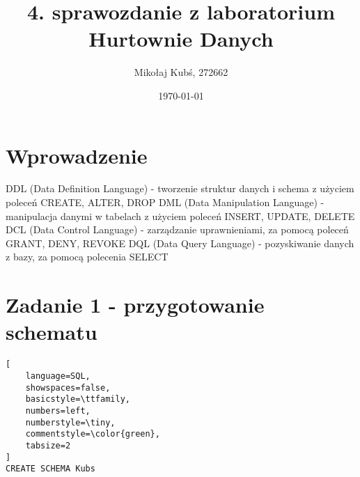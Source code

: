 \documentclass[a4paper,12pt]{article}
\title{4. sprawozdanie z laboratorium Hurtownie Danych}
\author{Mikołaj Kubś, 272662}
\date{\today}
\begin{document}
\maketitle

\section{Wprowadzenie}

DDL (Data Definition Language) - tworzenie struktur danych i schema z użyciem poleceń CREATE, ALTER, DROP
DML (Data Manipulation Language) - manipulacja danymi w tabelach z użyciem poleceń INSERT, UPDATE, DELETE
DCL (Data Control Language) - zarządzanie uprawnieniami, za pomocą poleceń GRANT, DENY, REVOKE
DQL (Data Query Language) - pozyskiwanie danych z bazy, za pomocą polecenia SELECT

\section{Zadanie 1 - przygotowanie schematu}

 {\small
  \begin{lstlisting}[
	language=SQL,
	showspaces=false,
	basicstyle=\ttfamily,
	numbers=left,
	numberstyle=\tiny,
	commentstyle=\color{green},
	tabsize=2
]
CREATE SCHEMA Kubs
\end{lstlisting}}

\printbibliography
\end{document}
